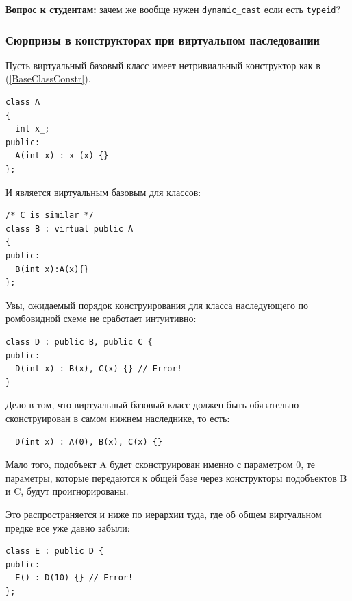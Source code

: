 \documentclass[a4paper,12pt,oneside]{article}
\newif\ifanswers
\begin{document}
\textbf{Вопрос к студентам:} зачем же вообще нужен \lstinline!dynamic_cast! если есть \lstinline!typeid!?

\ifanswers
Правильный ответ: в первую очередь из-за сложностей приведения в связке \lstinline!typeid! + \lstinline!static_cast! (см. выше разговор о том почему в иерархиях множественного наследования нам вообще не хватает статического приведения).
\fi

\subsubsection{Сюрпризы в конструкторах при виртуальном наследовании}\label{VirtualBaseClassConstr}

Пусть виртуальный базовый класс имеет нетривиальный конструктор как в (\ref{BaseClassConstr}).

\begin{lstlisting}
class A 
{
  int x_;
public:
  A(int x) : x_(x) {}
};
\end{lstlisting}

И является виртуальным базовым для классов:

\begin{lstlisting}
/* C is similar */
class B : virtual public A
{
public:
  B(int x):A(x){}
};
\end{lstlisting}

Увы, ожидаемый порядок конструирования для класса наследующего по ромбовидной схеме не сработает интуитивно:

\begin{lstlisting}
class D : public B, public C {
public:
  D(int x) : B(x), C(x) {} // Error!
}
\end{lstlisting}

Дело в том, что виртуальный базовый класс должен быть обязательно сконструирован в самом нижнем наследнике, то есть:

\begin{lstlisting}
  D(int x) : A(0), B(x), C(x) {} 
\end{lstlisting}

Мало того, подобъект A будет сконструирован именно с параметром 0, те параметры, которые передаются к общей базе через конструкторы подобъектов B и C, будут проигнорированы.

Это распространяется и ниже по иерархии туда, где об общем виртуальном предке все уже давно забыли:

\begin{lstlisting}
class E : public D {
public:
  E() : D(10) {} // Error!
};
\end{lstlisting}
\end{document}
